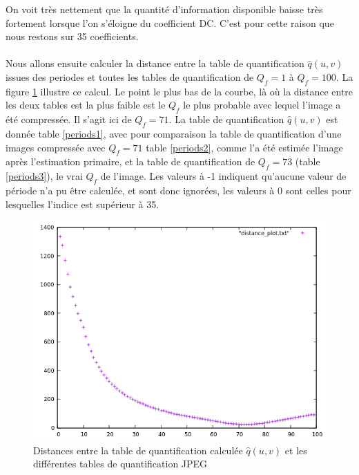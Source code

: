 \documentclass[utf8,final]{stageM2R} %
\begin{document}
On voit très nettement que la quantité d'information disponible baisse très fortement lorsque l'on s'éloigne du coefficient DC. C'est pour cette raison que nous restons sur 35 coefficients.

\paragraph{}
Nous allons ensuite calculer la distance entre la table de quantification $\widehat{q}(u,v)$ issues des periodes et toutes les tables de quantification de $Q_f = 1$ à $Q_f = 100$. La figure \ref{fig:distances} illustre ce calcul. Le point le plus bas de la courbe, là où la distance entre les deux tables est la plus faible est le $Q_f$ le plus probable avec lequel l'image a été compressée. Il s'agit ici de $Q_f = 71$. La table de quantification $\widehat{q}(u,v)$ est donnée table \ref{periods1}, avec pour comparaison la table de quantification d'une images compressée avec $Q_f = 71$ table \ref{periods2}, comme l'a été estimée l'image après l'estimation primaire, et la table de quantification de $Q_f = 73$ (table \ref{periods3}), le vrai $Q_f$ de l'image. Les valeurs à -1 indiquent qu'aucune valeur de période n'a pu être calculée, et sont donc ignorées, les valeurs à 0 sont celles pour lesquelles l'indice est supérieur à 35.

\begin{figure}
  \centering
  \includegraphics[width=0.7\linewidth]{images/distances}

  \caption{Distances entre la table de quantification calculée $\widehat{q}(u,v)$ et les différentes tables de quantification JPEG}
  \label{fig:distances}
\end{figure}
\end{document}
